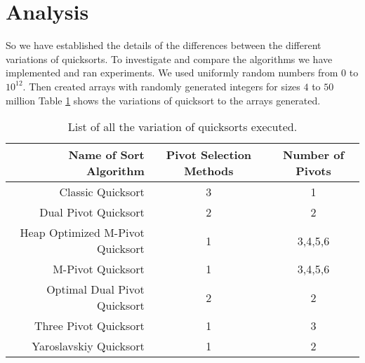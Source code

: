 

\section{Analysis}
	\label{sec:Analysis}
	So we have established the details of the differences between the different variations of quicksorts.
	To investigate and compare the algorithms we have implemented and ran experiments. 
	We used uniformly random numbers from $0$ to $10^{12}$.
	Then created arrays with randomly generated integers for sizes $4$ to $50$ million
	Table \ref{tab:FullSortList} shows the variations of quicksort to the arrays generated.
	\begin{table}
		\begin{center}
			\begin{tabular}{|r|c|c|}
				\hline
				Name of Sort Algorithm           & Pivot Selection Methods & Number of Pivots \\ \hline \hline
				Classic Quicksort                &  3  &  1       \\ \hline
				Dual Pivot Quicksort             &  2  &  2       \\ \hline
				Heap Optimized M-Pivot Quicksort &  1  &  3,4,5,6 \\ \hline
				M-Pivot Quicksort                &  1  &  3,4,5,6 \\ \hline
				Optimal Dual Pivot Quicksort     &  2  &  2       \\ \hline
				Three Pivot Quicksort            &  1  &  3       \\ \hline
				Yaroslavskiy Quicksort           &  1  &  2       \\ \hline
			\end{tabular}
			\caption{List of all the variation of quicksorts executed.}
			\label{tab:FullSortList}
		\end{center}
	\end{table}



